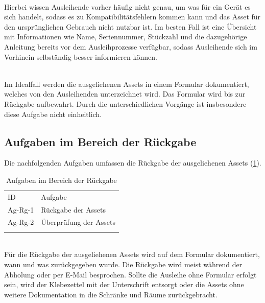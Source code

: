 {\sffamily\color{maincolor}{Ag-Au-2 | Erläuterung der Assetnutzung}}\\
Hierbei wissen Ausleihende vorher häufig nicht genau, um was für ein Gerät es sich handelt, sodass
es zu Kompatibilitätsfehlern kommen kann und das Asset für den ursprünglichen Gebrauch nicht nutzbar
ist. Im besten Fall ist eine Übersicht mit Informationen wie Name, Seriennummer, Stückzahl und die
dazugehörige Anleitung bereits vor dem Ausleihprozesse verfügbar, sodass Ausleihende sich im
Vorhinein selbständig besser informieren können.

{\sffamily\color{maincolor}{Ag-Au-3 | Unterschreiben des Formulars}}\\
Im Idealfall werden die ausgeliehenen Assets in einem Formular dokumentiert, welches von den
Ausleihenden unterzeichnet wird. Das Formular wird bis zur Rückgabe aufbewahrt. Durch die
unterschiedlichen Vorgänge ist insbesondere diese Aufgabe nicht einheitlich.

\subsection{Aufgaben im Bereich der Rückgabe}
Die nachfolgenden Aufgaben umfassen die Rückgabe der ausgeliehenen Assets (\ref{table:Ag-Rg}).
\begin{table}[h]
        \centering
        \caption{Aufgaben im Bereich der Rückgabe}
        \begin{tabular}{ll}
                \arrayrulecolor{maincolor}\hline
                \sffamily\color{maincolor}ID & \sffamily\color{maincolor}Aufgabe \\
                \arrayrulecolor{maincolor}\hline
                Ag-Rg-1                      & Rückgabe der Assets               \\
                Ag-Rg-2                      & Überprüfung der Assets            \\
                \arrayrulecolor{maincolor}\hline
        \end{tabular}
        \label{table:Ag-Rg}
\end{table}

{\sffamily\color{maincolor}{Ag-Rg-1 | Rückgabe der Assets}} \\
Für die Rückgabe der ausgeliehenen Assets wird auf dem Formular dokumentiert, wann
und was zurückgegeben wurde. Die Rückgabe wird meist während der Abholung oder per E-Mail
besprochen. Sollte die Ausleihe ohne Formular erfolgt sein, wird der Klebezettel mit der
Unterschrift entsorgt oder die Assets ohne weitere Dokumentation in die Schränke und Räume
zurückgebracht.

